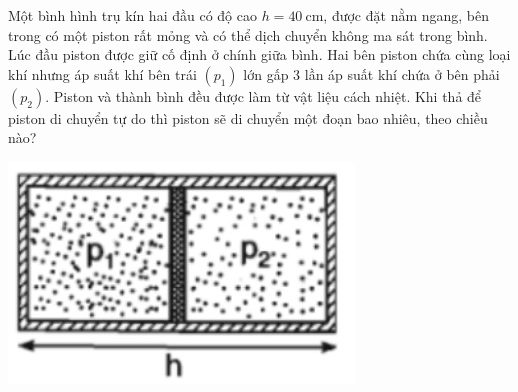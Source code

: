 \begin{vd}
	Một bình hình trụ kín hai đầu có độ cao $h=\SI{40}{\centi\meter}$, được đặt nằm ngang, bên trong có một piston rất mỏng và có thể dịch chuyển không ma sát trong bình. Lúc đầu piston được giữ cố định ở chính giữa bình. Hai bên piston chứa cùng loại khí nhưng áp suất khí bên trái $\left(p_1\right)$ lớn gấp 3 lần áp suất khí chứa ở bên phải $\left(p_2\right)$. Piston và thành bình đều được làm từ vật liệu cách nhiệt. Khi thả để piston di chuyển tự do thì piston sẽ di chuyển một đoạn bao nhiêu, theo chiều nào?
		\begin{center}
			\includegraphics[width=0.25\linewidth]{figs/VN12-Y24-PH-SYL-010-10}
		\end{center}
\end{vd}
